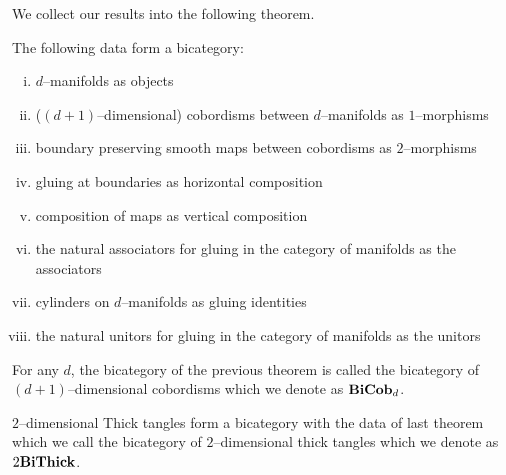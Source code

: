 \documentclass[./Thick_TQFTs_and_Quantum_Information.tex]{subfiles}
\begin{document}
We collect our results into the following theorem.
\begin{thm}
The following data form a bicategory:
\begin{enumerate}[(i)]
\setlength{\itemsep}{0pt}
\item $d$--manifolds as objects
\item ($(d + 1)$--dimensional) cobordisms between $d$--manifolds as
$1$--morphisms
\item boundary preserving smooth maps between cobordisms as $2$--morphisms
\item gluing at boundaries as horizontal composition
\item composition of maps as vertical composition
\item the natural associators for gluing in the category of manifolds as the
associators
\item cylinders on $d$--manifolds as gluing identities
\item the natural unitors for gluing in the category of manifolds as the unitors
\end{enumerate}
\end{thm}

\begin{defn}
For any $d$, the bicategory of the previous theorem is called the bicategory of
$(d + 1)$--dimensional cobordisms which we denote as $\textbf{BiCob}_d$.
\end{defn}

\begin{defn}
$2$--dimensional Thick tangles form a bicategory with the data of last theorem
which we call the bicategory of $2$--dimensional thick tangles which we denote
as $2\textbf{BiThick}$.
\end{defn}
\end{document}
